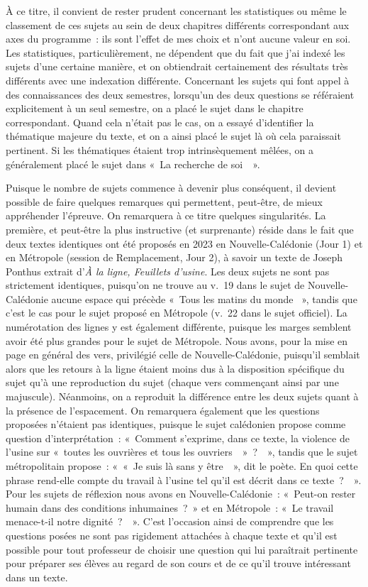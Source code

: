 À ce titre, il convient de rester prudent concernant les statistiques ou même le classement de ces sujets au sein de deux chapitres différents correspondant aux axes du programme~: ils sont l'effet de mes choix et n'ont aucune valeur en soi. Les statistiques, particulièrement, ne dépendent que du fait que j'ai indexé les sujets d'une certaine manière, et on obtiendrait certainement des résultats très différents avec une indexation différente. Concernant les sujets qui font appel à des connaissances des deux semestres, lorsqu'un des deux questions se référaient explicitement à un seul semestre, on a placé le sujet dans le chapitre correspondant. Quand cela n'était pas le cas, on a essayé d'identifier la thématique majeure du texte, et on a ainsi placé le sujet là où cela paraissait pertinent. Si les thématiques étaient trop intrinsèquement mêlées, on a généralement placé le sujet dans «~La recherche de soi~~». 

Puisque le nombre de sujets commence à devenir plus conséquent, il devient possible de faire quelques remarques qui permettent, peut-être, de mieux appréhender l'épreuve. On remarquera à ce titre quelques singularités. La première, et peut-être la plus instructive (et surprenante) réside dans le fait que deux textes identiques ont été proposés en 2023 en Nouvelle-Calédonie (Jour 1) et en Métropole (session de Remplacement, Jour 2), à savoir un texte de Joseph Ponthus extrait d'\textit{À la ligne, Feuillets d'usine}. Les deux sujets ne sont pas strictement identiques, puisqu'on ne trouve au v.~19 dans le sujet de Nouvelle-Calédonie aucune espace qui précède «~Tous les matins du monde ~», tandis que c'est le cas pour le sujet proposé en Métropole (v.~22 dans le sujet officiel). La numérotation des lignes y est également différente, puisque les marges semblent avoir été plus grandes pour le sujet de Métropole. Nous avons, pour la mise en page en général des vers, privilégié celle de Nouvelle-Calédonie, puisqu'il semblait alors que les retours à la ligne étaient moins dus à la disposition spécifique du sujet qu'à une reproduction du sujet (chaque vers commençant ainsi par une majuscule). Néanmoins, on a reproduit la différence entre les deux sujets quant à la présence de l'espacement. On remarquera également que les questions proposées n'étaient pas identiques, puisque le sujet calédonien propose comme question d'interprétation~: «~Comment s'exprime, dans ce texte, la violence de l'usine sur «~toutes les ouvrières et tous les ouvriers~~»~?~~», tandis que le sujet métropolitain propose~: «~«~Je suis là sans y être~~», dit le poète. En quoi cette phrase rend-elle compte du travail à l'usine tel qu'il est décrit dans ce texte~?~~». Pour les sujets de réflexion nous avons en Nouvelle-Calédonie~: «~Peut-on rester humain dans des conditions inhumaines~?~»  et en Métropole~: «~Le travail menace-t-il notre dignité~?~~». C'est l'occasion ainsi de comprendre que les questions posées ne sont pas rigidement attachées à chaque texte et qu'il est possible pour tout professeur de choisir une question qui lui paraîtrait pertinente pour préparer ses élèves au regard de son cours et de ce qu'il trouve intéressant dans un texte.

